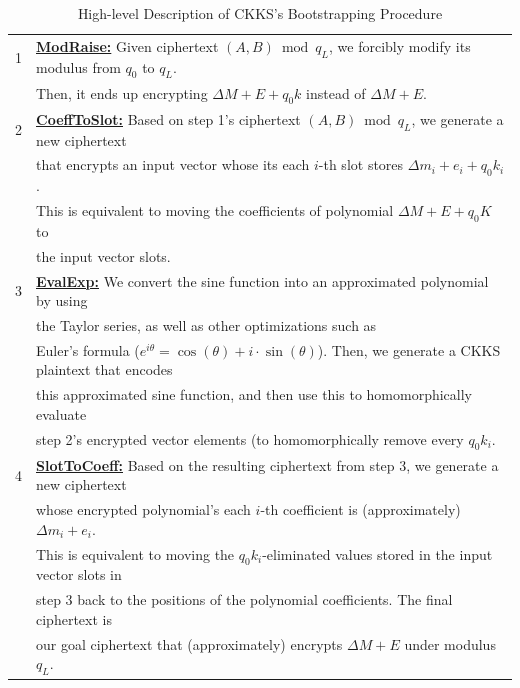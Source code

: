 \begin{table}
\begin{tabular}{|ll|}
\hline
1& \textsf{\textbf{\underline{ModRaise:}}} Given ciphertext $(A, B) \bmod q_L$, we forcibly modify its modulus from $q_0$ to $q_L$. \\
& Then, it ends up encrypting $\Delta M + E + q_0k$ instead of $\Delta M + E$.\\
2& \textsf{\textbf{\underline{CoeffToSlot:}}} Based on step 1's ciphertext $(A, B) \bmod q_L$, we generate a new ciphertext\\
& that encrypts an input vector whose its each $i$-th slot stores $\Delta m_i + e_i + q_0k_i$.\\
& This is equivalent to moving the coefficients of polynomial $\Delta M + E + q_0K$ to\\
& the input vector slots.\\
3& \textsf{\textbf{\underline{EvalExp:}}} We convert the sine function into an approximated polynomial by using \\
& the Taylor series, as well as other optimizations such as\\ 
& Euler's formula ($e^{i\theta} = \cos(\theta) + i\cdot\sin(\theta)$). Then, we generate a CKKS plaintext that encodes \\
& this approximated sine function, and then use this to homomorphically evaluate \\
& step 2's encrypted vector elements (to homomorphically remove every $q_0k_i$.\\
4& \textsf{\textbf{\underline{SlotToCoeff:}}} Based on the resulting ciphertext from step 3, we generate a new ciphertext \\
& whose encrypted polynomial's each $i$-th coefficient is (approximately) $\Delta m_i + e_i$. \\
& This is equivalent to moving the $q_0k_i$-eliminated values stored in the input vector slots in \\
&step 3 back to the positions of the polynomial coefficients. The final ciphertext is \\
& our goal ciphertext that (approximately) encrypts $\Delta M + E$ under modulus $q_L$.\\
\hline
\end{tabular}
\caption{High-level Description of CKKS's Bootstrapping Procedure}
\label{tab:ckks-bootstrapping-procedure}
\end{table}

